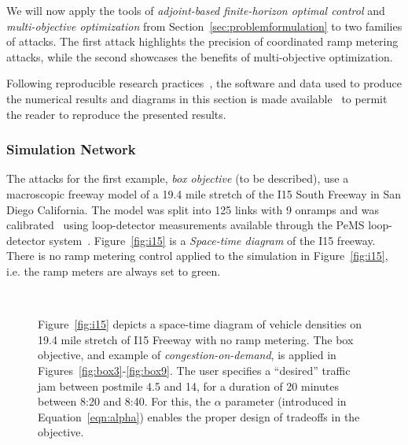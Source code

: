 We will now apply the tools of \emph{adjoint-based finite-horizon optimal control} and \emph{multi-objective optimization} from Section~\ref{sec:problemformulation} to two families of attacks. The first attack highlights the precision of coordinated ramp metering attacks, while the second showcases the benefits of multi-objective optimization.

Following reproducible research practices~\cite{donoho2009reproducible,stodden2009enabling}, the software and data used to produce the numerical results and diagrams in this section is made available~\cite{smartroadswebsite} to permit the reader to reproduce the presented results.

\subsubsection{Simulation Network}

The attacks for the first example, \emph{box objective} (to be described), use a macroscopic freeway model of a 19.4 mile stretch of the I15 South Freeway in San Diego California. The model was split into 125 links with 9 onramps and was calibrated~\cite{dervisoglu2014macroscopic,Muralidharan2009c} using loop-detector measurements available through the PeMS loop-detector system~\cite{jia2001pems}. Figure~\ref{fig:i15} is a \emph{Space-time diagram} of the I15 freeway. There is no ramp metering control applied to the simulation in Figure~\ref{fig:i15}, i.e. the ramp meters are always set to green.

\begin{figure}
\centering
{}\\
\hfill
{}\hfill
{}%
\caption[I15 South box objective attack with multiple trade-off parameter values.]{Figure~\ref{fig:i15} depicts a space-time diagram of vehicle densities on 19.4 mile stretch of I15 Freeway with no ramp metering. The box objective, and example of \emph{congestion-on-demand}, is applied in Figures~\ref{fig:box3}-\ref{fig:box9}. The user specifies a ``desired'' traffic jam between postmile 4.5 and 14, for a duration of 20 minutes between 8:20 and 8:40. For this, the $\alpha$ parameter (introduced in Equation~\eqref{eqn:alpha}) enables the proper design of tradeoffs in the objective.}
\end{figure}

